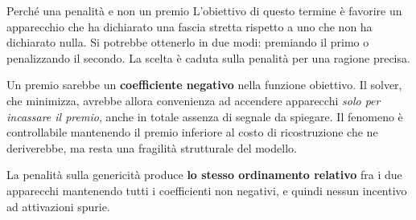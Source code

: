 \begin{notebox}{Perché una penalità e non un premio}
L'obiettivo di questo termine è favorire un apparecchio che ha dichiarato una fascia stretta
rispetto a uno che non ha dichiarato nulla. Si potrebbe ottenerlo in due modi: premiando il primo
o penalizzando il secondo. La scelta è caduta sulla penalità per una ragione precisa.

Un premio sarebbe un \textbf{coefficiente negativo} nella funzione obiettivo. Il solver, che
minimizza, avrebbe allora convenienza ad accendere apparecchi \emph{solo per incassare il premio},
anche in totale assenza di segnale da spiegare. Il fenomeno è controllabile mantenendo il premio
inferiore al costo di ricostruzione che ne deriverebbe, ma resta una fragilità strutturale del
modello.

La penalità sulla genericità produce \textbf{lo stesso ordinamento relativo} fra i due apparecchi
mantenendo tutti i coefficienti non negativi, e quindi nessun incentivo ad attivazioni spurie.
\end{notebox}
